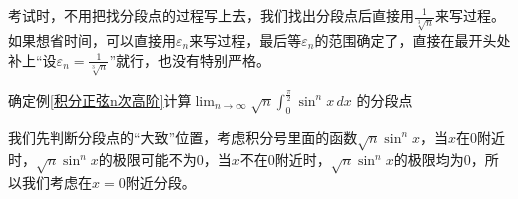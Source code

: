 \begin{remark}\label{喵}
考试时，不用把找分段点的过程写上去，我们找出分段点后直接用$\frac{1}{\sqrt[3]{n}}$来写过程。如果想省时间，可以直接用$\varepsilon_n$来写过程，最后等$\varepsilon_n$的范围确定了，直接在最开头处补上“设$\varepsilon_n=\frac{1}{\sqrt[3]{n}}$”就行，也没有特别严格。
\end{remark}


\vspace{1mm}
\begin{example}
确定例\ref{积分正弦n次高阶}计算$ \displaystyle 
\lim_{n \to \infty} \sqrt{n} \int_{0}^{\frac{\pi}{2}} \sin^{n}x \,dx$
的分段点
\end{example}

\begin{remark}
我们先判断分段点的“大致”位置，考虑积分号里面的函数$\sqrt{n}\sin^n x $，当$x$在0附近时，$\sqrt{n}\sin^n x \text{的极限可能不为0} $，当$x$不在0附近时，$\sqrt{n}\sin^n x \text{的极限均为0} $，所以我们考虑在$x=0$附近分段。
\end{remark}

